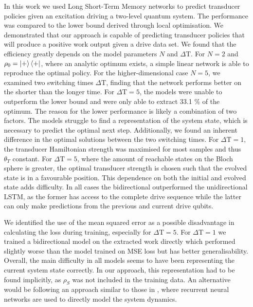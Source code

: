 In this work we used Long Short-Term Memory networks to predict transducer policies given an excitation driving a two-level quantum system.
The performance was compared to the lower bound derived through local optimisation.
We demonstrated that our approach is capable of predicting transducer policies that will produce a positive work output given a drive data set.
We found that the efficiency greatly depends on the model parameters $N$ and $\Delta \mathrm{T}$.
For $N=2$ and $\rho_0 = \ket{+}\bra{+}$, where an analytic optimum exists, a simple linear network is able to reproduce the optimal policy.
For the higher-dimensional case $N=5$, we examined two switching times $\Delta \mathrm{T}$, finding that the network performs better on the shorter than the longer time.
For $\Delta \mathrm{T} = 5$, the models were unable to outperform the lower bound and were only able to extract 33.1 \% of the optimum.
The reason for the lower performance is likely a combination of two factors.
The models struggle to find a representation of the system state, which is necessary to predict the optimal next step.
Additionally, we found an inherent difference in the optimal solutions between the two switching times. For $\Delta \mathrm{T} = 1$, the transducer Hamiltonian strength was maximised for most samples and thus $\theta_T$ constant.
For $\Delta \mathrm{T} = 5$, where the amount of reachable states on the Bloch sphere is greater, the optimal transducer strength is chosen such that the evolved state is in a favourable position.
This dependence on both the initial and evolved state adds difficulty.
In all cases the bidirectional outperformed the unidirectional LSTM, as the former has access to the complete drive sequence while the latter can only make predictions from the previous and current drive qubits.

We identified the use of the mean squared error as a possible disadvantage in calculating the loss during training, especially for $\Delta \mathrm{T} = 5$.
For $\Delta \mathrm{T} = 1$ we trained a bidirectional model on the extracted work directly which performed slightly worse than the model trained on MSE loss but has better generalisability.
Overall, the main difficulty in all models seems to have been representing the current system state correctly.
In our approach, this representation had to be found implicitly, as $\rho_S$ was not included in the training data.
An alternative would be following an approach similar to those in \cite{Banchi_2018, PhysRevX.10.011006}, where recurrent neural networks are used to directly model the system dynamics.

